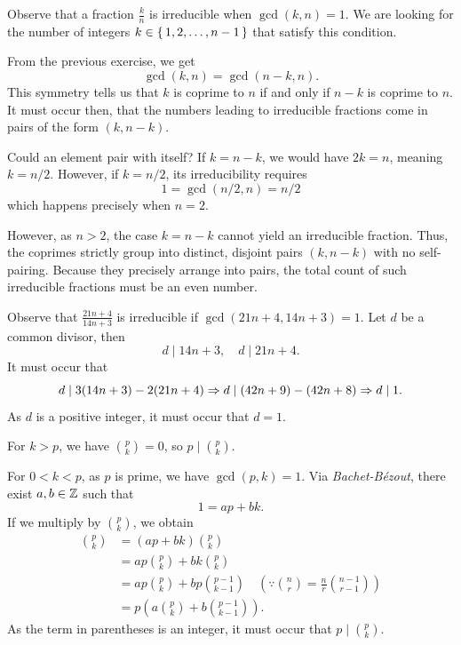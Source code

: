 \documentclass[12pt]{memoir}
\begin{document}
\begin{Ej}
    Observe that a fraction \(\frac{k}{n}\) is irreducible when \(\gcd(k, n) = 1\). We are looking for the number of integers \(k \in \{\,1, 2, \dots, n-1\,\}\) that satisfy this condition.\par
    
    From the previous exercise, we get
    \[
    \gcd(k, n) = \gcd(n-k, n).
    \]
    This symmetry tells us that \(k\) is coprime to \(n\) if and only if \(n-k\) is coprime to \(n\). It must occur then, that the numbers leading to irreducible fractions come in pairs of the form \((k, n-k)\).\par
    
    Could an element pair with itself? 
    If \(k = n-k\), we would have \(2k = n\), meaning \(k = n/2\). 
    However, if \(k = n/2\), its irreducibility requires 
    \[
    1 = \gcd(n/2, n) = n/2
    \]
    which happens precisely when \(n = 2\). \par
    
    However, as \(n > 2\), the case \(k = n-k\) cannot yield an irreducible fraction. Thus, the coprimes strictly group into distinct, disjoint pairs \((k, n-k)\) with no self-pairing. 
    Because they precisely arrange into pairs, the total count of such irreducible fractions must be an even number.
\end{Ej}

\begin{Ej}
    Observe that \(\frac{21n + 4}{14n + 3}\) is irreducible if \(\gcd(21n+4, 14n+3)=1\). Let \(d\) be a common divisor, then
    \[
    d\mid 14n+3, \quad d\mid 21n+4.
    \]
    It must occur that
    \[
    d \mid 3(14n+3) - 2(21n+4) \To d \mid (42n+9) - (42n+8) \To d \mid 1.
    \]
    As \(d\) is a positive integer, it must occur that \(d = 1\).
\end{Ej}

\begin{Ej}
    For \(k > p\), we have \(\binom{p}{k} = 0\), so \(p \mid \binom{p}{k}\). \par
    For \(0 < k < p\), as \(p\) is prime, we have \(\gcd(p, k) = 1\). Via \emph{Bachet-B\'{e}zout}, there exist \(a, b \in \mathbb{Z}\) such that 
    \[
    1 = ap+bk.
    \]
    If we multiply by \(\binom{p}{k}\), we obtain
    \begin{align*}
        \binom{p}{k} &= (ap+bk)\binom{p}{k} \\
        &= ap\binom{p}{k} + bk\binom{p}{k} \\
        &= ap\binom{p}{k} + bp\binom{p-1}{k-1} \quad \left(\because \binom{n}{r} = \frac{n}{r} \binom{n-1}{r-1}\right) \\
        &= p\left(a\binom{p}{k} + b\binom{p-1}{k-1}\right).
    \end{align*}
    As the term in parentheses is an integer, it must occur that \(p \mid \binom{p}{k}\). 
\end{Ej}
\end{document}
